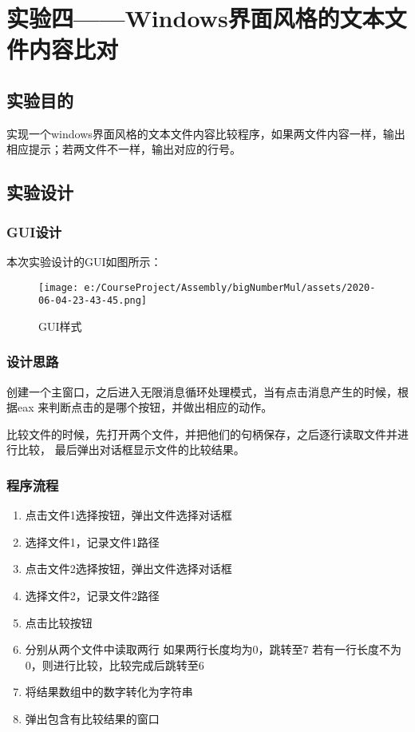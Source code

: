 \chapter{实验四——Windows界面风格的文本文件内容比对}

\section{实验目的}
实现一个windows界面风格的文本文件内容比较程序，如果两文件内容一样，输出相应提示；若两文件不一样，输出对应的行号。

\section{实验设计}

\subsection{GUI设计}
本次实验设计的GUI如图所示：
\begin{figure}[H]
    \centering
    \texttt{[image: e:/CourseProject/Assembly/bigNumberMul/assets/2020-06-04-23-43-45.png]}
    \caption{GUI样式}
    \label{GUI样式}
\end{figure}


\subsection{设计思路}
创建一个主窗口，之后进入无限消息循环处理模式，当有点击消息产生的时候，根据eax
来判断点击的是哪个按钮，并做出相应的动作。

比较文件的时候，先打开两个文件，并把他们的句柄保存，之后逐行读取文件并进行比较，
最后弹出对话框显示文件的比较结果。

\subsection{程序流程}
\begin{enumerate}
    \item 点击文件1选择按钮，弹出文件选择对话框
    \item 选择文件1，记录文件1路径
    \item 点击文件2选择按钮，弹出文件选择对话框
    \item 选择文件2，记录文件2路径
    \item 点击比较按钮
    \item 分别从两个文件中读取两行
          \iitem 如果两行长度均为0，跳转至7
          \iitem 若有一行长度不为0，则进行比较，比较完成后跳转至6
    \item 将结果数组中的数字转化为字符串
    \item 弹出包含有比较结果的窗口
\end{enumerate}


